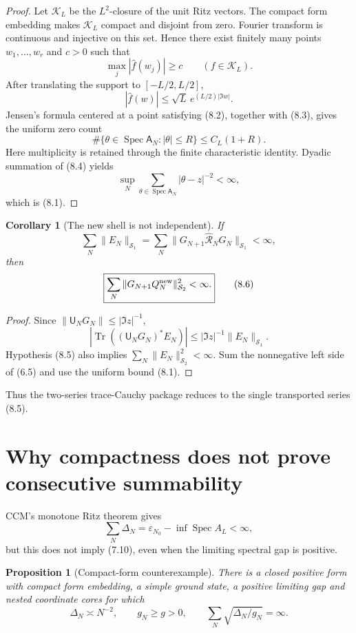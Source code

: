 \documentclass[11pt]{amsart}
\newtheorem{proposition}[theorem]{Proposition}
\newtheorem{corollary}[theorem]{Corollary}
\theoremstyle{definition}
\theoremstyle{remark}
\newcommand{\Schatten}{\mathcal S}
\newcommand{\Spec}{\operatorname{Spec}}
\newcommand{\Tr}{\operatorname{Tr}}
\newcommand{\eps}{\varepsilon}
\begin{document}
\begin{proof}
Let \(\mathcal K_L\) be the \(L^2\)-closure of the unit Ritz vectors.  The
compact form embedding makes \(\mathcal K_L\) compact and disjoint from
zero.  Fourier transform is continuous and injective on this set.  Hence
there exist finitely many points \(w_1,\ldots,w_r\) and \(c>0\) such that
\[
 \max_j|\widehat f(w_j)|\ge c
 \qquad(f\in\mathcal K_L).
\tag{8.2}
\]
After translating the support to \([-L/2,L/2]\),
\[
 |\widehat f(w)|\le\sqrt L\,e^{(L/2)|\Im w|}.
\tag{8.3}
\]
Jensen's formula centered at a point satisfying (8.2), together with
(8.3), gives the uniform zero count
\[
 \#\{\theta\in\Spec\mathsf A_N:|\theta|\le R\}
 \le C_L(1+R).
\tag{8.4}
\]
Here multiplicity is retained through the finite characteristic identity.
Dyadic summation of (8.4) yields
\[
 \sup_N\sum_{\theta\in\Spec\mathsf A_N}|\theta-z|^{-2}<\infty,
\]
which is (8.1).
\end{proof}

\begin{corollary}[The new shell is not independent]
If
\[
 \sum_N\|E_N\|_{\Schatten_1}
 =\sum_N\|G_{N+1}\widehat{\mathcal R}_NG_N\|_{\Schatten_1}<\infty,
\tag{8.5}
\]
then
\[
\boxed{
 \sum_N\|G_{N+1}Q_N^{\rm new}\|_{\Schatten_2}^2<\infty.}
\tag{8.6}
\]
\end{corollary}

\begin{proof}
Since \(\|\mathsf U_NG_N\|\le|\Im z|^{-1}\),
\[
 |\Tr((\mathsf U_NG_N)^*E_N)|
 \le|\Im z|^{-1}\|E_N\|_{\Schatten_1}.
\]
Hypothesis (8.5) also implies
\(\sum_N\|E_N\|_{\Schatten_2}^2<\infty\).  Sum the nonnegative left side
of (6.5) and use the uniform bound (8.1).
\end{proof}

Thus the two-series trace-Cauchy package reduces to the single transported
series (8.5).

\section{Why compactness does not prove consecutive summability}
\label{sec:counterexample}

CCM's monotone Ritz theorem gives
\[
 \sum_N\Delta_N
 =\eps_{N_0}-\inf\Spec A_L<\infty,
\tag{9.1}
\]
but this does not imply (7.10), even when the limiting spectral gap is
positive.

\begin{proposition}[Compact-form counterexample]
There is a closed positive form with compact form embedding, a simple ground
state, a positive limiting gap and nested coordinate cores for which
\[
 \Delta_N\asymp N^{-2},\qquad g_N\ge g>0,\qquad
 \sum_N\sqrt{\Delta_N/g_N}=\infty.
\tag{9.2}
\]
\end{proposition}
\end{document}
